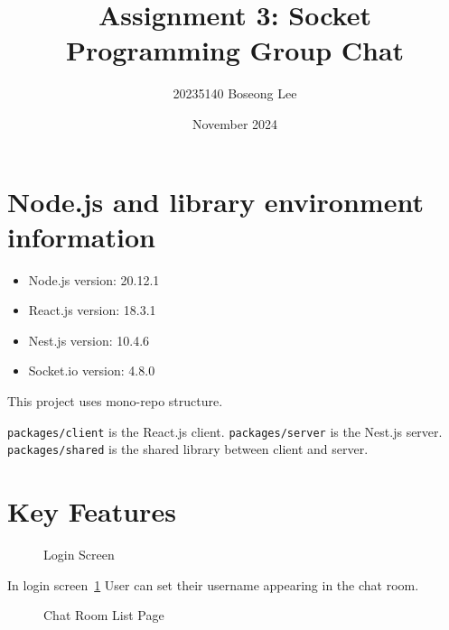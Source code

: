 \documentclass[11pt]{article}
\title{Assignment 3: Socket Programming Group Chat}
\author{20235140 Boseong Lee}
\date{November 2024}
\begin{document}
\maketitle

\section{Node.js and library environment information}
\begin{itemize}
  \item Node.js version: 20.12.1
  \item React.js version: 18.3.1
  \item Nest.js version: 10.4.6
  \item Socket.io version: 4.8.0
\end{itemize}

This project uses mono-repo structure.

\texttt{packages/client} is the React.js client.
\texttt{packages/server} is the Nest.js server.
\texttt{packages/shared} is the shared library between client and server.

\section{Key Features}

\begin{figure}[ht!]
  \centering
  \caption{Login Screen}
  \label{fig:1}
\end{figure}

In login screen~\ref{fig:1} User can set their username appearing in the chat room.

\begin{figure}[H]
  \centering
  \caption{Chat Room List Page}
  \label{fig:2}
\end{figure}
\end{document}
